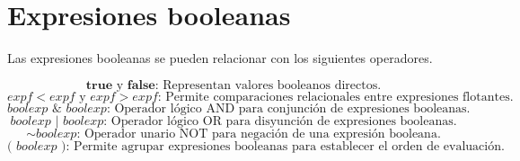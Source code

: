 \documentclass[11pt]{scrartcl}
\begin{document}
\section{Expresiones booleanas}
Las expresiones booleanas se pueden relacionar con los siguientes operadores.

\begin{equation*}
\textbf{true} \text{ y } \textbf{false}\text{: Representan valores booleanos directos.}
\end{equation*}
\begin{equation*}
\textit{expf} < \textit{expf} \text{ y } \textit{expf} > \textit{expf}\text{: Permite comparaciones relacionales entre expresiones flotantes.}
\end{equation*}
\begin{equation*}
\textit{boolexp } \& \textit{ boolexp}\text{: Operador lógico AND para conjunción de expresiones booleanas.}
\end{equation*}
\begin{equation*}
\textit{boolexp } | \textit{ boolexp}\text{: Operador lógico OR para disyunción de expresiones booleanas.}
\end{equation*}
\begin{equation*}
\sim \textit{boolexp}\text{: Operador unario NOT para negación de una expresión booleana.}
\end{equation*}
\begin{equation*}
\textbf{(} \textit{ boolexp } \textbf{)}\text{: Permite agrupar expresiones booleanas para establecer el orden de evaluación.}
\end{equation*}
\end{document}
